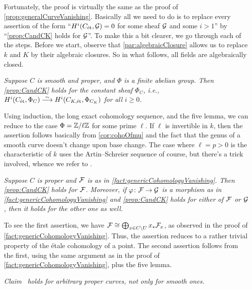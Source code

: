 \begin{proof*}
	Fortunately, the proof is virtually the same as the proof of \cref{prop:generalCurveVanishing}. Basically all we need to do is to replace every assertion of the form \enquote{$H^i(C_{\mathrm{\acute{e}t}},\mathcal{G})=0$ for some sheaf $\mathcal{G}$ and some $i>1$} by \enquote{\cref{prop:CandCK} holds for $\mathcal{G}$}. To make this a bit clearer, we go through each of the steps. Before we start, observe that \cref{par:algebraicClosure} allows us to replace $k$ and $K$ by their algebraic closures. So in what follows, all fields are algebraically closed.
	\begin{numerate}
		\item \itshape Suppose $C$ is smooth and proper, and $\Phi$ is a finite abelian group. Then \cref{prop:CandCK} holds for the constant sheaf $\Phi_C$, i.e., $H^i(C_\et,\Phi_C)\isomorphism H^i(C_{K,\et},\Phi_{C_K})$ for all $i\geq 0$.
	\end{numerate}
	Using induction, the long exact cohomology sequence, and the five lemma, we can reduce  to the case $\Phi=\mathbb{Z}/\ell\mathbb{Z}$ for some prime $\ell$. If $\ell$ is invertible in $k$, then the assertion follows basically from \cref{cor:cohoOfmu} and the fact that the genus of a smooth curve doesn't change upon base change. The case where $\ell=p>0$ is the characteristic of $k$ uses the Artin--Schreier sequence of course, but there's a trick involved, whence we refer to \cite[]{stacks-project}.
	\begin{numerate}
		\item[\itememph{2}] \itshape Suppose $C$ is proper and $\mathcal{F}$ is as in \cref{fact:genericCohomologyVanishing}. Then \cref{prop:CandCK} holds for $\mathcal{F}$. Moreover, if $\phi\colon\Ff\morphism \Gg$ is a morphism as in \cref{fact:genericCohomologyVanishing} and \cref{prop:CandCK} holds for either of $\mathcal{F}$ or $\mathcal{G}$, then it holds for the other one as well.
	\end{numerate}
	To see the first assertion, we have $\mathcal{F}\cong\bigoplus_{x\in C\setminus U}x_*\mathcal{F}_x$, as observed in the proof of \cref{fact:genericCohomologyVanishing}. Thus, the assertion reduces to a rather trivial property of the étale cohomology of a point. The second assertion follows from the first, using the same argument as in the proof of \cref{fact:genericCohomologyVanishing}, plus the five lemma.
	\begin{numerate}
		\item[\itememph{3}] \itshape Claim~ holds for arbitrary proper curves, not only for smooth ones.

\end{numerate}
\end{proof*}
